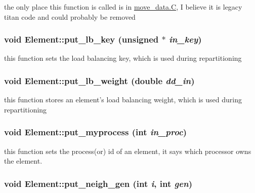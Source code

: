 the only place this function is called is in \hyperlink{constant_8h_a21}{move\_\-data.C}, I believe it is legacy titan code and could probably be removed 

\hypertarget{classElement_a57}{
\subsubsection[put\_\-lb\_\-key]{\setlength{\rightskip}{0pt plus 5cm}void Element::put\_\-lb\_\-key (unsigned $\ast$ {\em in\_\-key})}}
\label{classElement_a57}


this function sets the load balancing key, which is used during repartitioning 

\hypertarget{classElement_a55}{
\subsubsection[put\_\-lb\_\-weight]{\setlength{\rightskip}{0pt plus 5cm}void Element::put\_\-lb\_\-weight (double {\em dd\_\-in})}}
\label{classElement_a55}


this function stores an element's load balancing weight, which is used during repartitioning 

\hypertarget{classElement_a59}{
\subsubsection[put\_\-myprocess]{\setlength{\rightskip}{0pt plus 5cm}void Element::put\_\-myprocess (int {\em in\_\-proc})}}
\label{classElement_a59}


this function sets the process(or) id of an element, it says which processor owns the element. 

\hypertarget{classElement_a43}{
\subsubsection[put\_\-neigh\_\-gen]{\setlength{\rightskip}{0pt plus 5cm}void Element::put\_\-neigh\_\-gen (int {\em i}, int {\em gen})}}
\label{classElement_a43}


